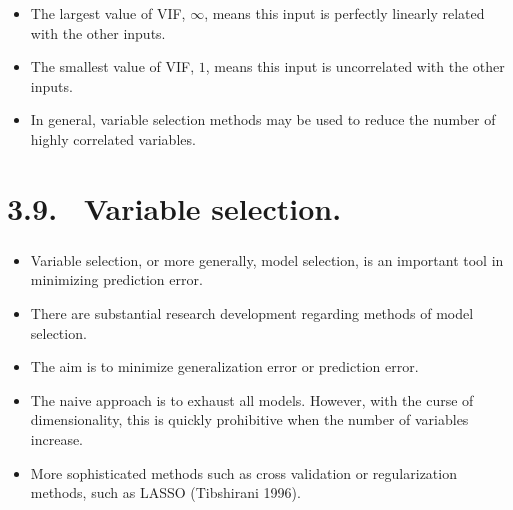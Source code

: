 \documentclass{beamer}
\begin{document}
      	
      	\begin{frame}
      		\frametitle{  }
      		\begin{itemize}	
      		
      		\item The largest value of VIF, $\infty$, means this input is perfectly linearly
      		related with the other inputs. 
      		
      		\item The smallest value of VIF, $1$, means this input is uncorrelated
      		with the other inputs. 
      		\item In general, variable selection methods may be used to reduce
      		the number of highly correlated variables.
      		
      	\end{itemize}
      \end{frame}
      
      \section{3.9.  \ Variable selection.}
      
      \begin{frame}
      	\frametitle{  }
      	\begin{itemize}
      		\item  
      		Variable selection, or more generally, model selection, is an important tool
      		in minimizing prediction error. 
      		\item   There are substantial research development
      		regarding methods of model selection. 
      		\item   The aim is to minimize generalization
      		error or prediction error. 
      		\item   The naive approach is to exhaust all models.
      		However, with the curse of dimensionality, this is quickly prohibitive when
      		the number of variables increase.
      		\item   
      		More sophisticated methods such as cross validation
      		or regularization methods, such as LASSO (Tibshirani 1996). 
      		
      	\end{itemize}
      \end{frame}
      
\end{document}
